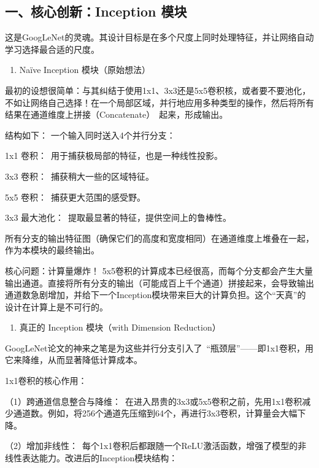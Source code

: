 \hypertarget{ux4e00ux6838ux5fc3ux521bux65b0inception-ux6a21ux5757}{%
\subsection{一、核心创新：Inception 模块}\label{ux4e00ux6838ux5fc3ux521bux65b0inception-ux6a21ux5757}}

这是GoogLeNet的灵魂。其设计目标是在多个尺度上同时处理特征，并让网络自动学习选择最合适的尺度。

\begin{enumerate}
\def\labelenumi{\arabic{enumi}.}
\tightlist
\item
  Naïve Inception 模块（原始想法）
\end{enumerate}

最初的设想很简单：与其纠结于使用1x1、3x3还是5x5卷积核，或者要不要池化，不如让网络自己选择！在一个局部区域，并行地应用多种类型的操作，然后将所有结果在通道维度上拼接（Concatenate）~起来，形成输出。

结构如下：
一个输入同时送入4个并行分支：

1x1 卷积：~用于捕获极局部的特征，也是一种线性投影。

3x3 卷积：~捕获稍大一些的区域特征。

5x5 卷积：~捕获更大范围的感受野。

3x3 最大池化：~提取最显著的特征，提供空间上的鲁棒性。

所有分支的输出特征图（确保它们的高度和宽度相同）在通道维度上堆叠在一起，作为本模块的最终输出。

核心问题：计算量爆炸！
5x5卷积的计算成本已经很高，而每个分支都会产生大量输出通道。直接将所有分支的输出（可能成百上千个通道）拼接起来，会导致输出通道数急剧增加，并给下一个Inception模块带来巨大的计算负担。这个``天真''的设计在计算上是不可行的。

\begin{enumerate}
\def\labelenumi{\arabic{enumi}.}
\setcounter{enumi}{1}
\tightlist
\item
  真正的 Inception 模块（with Dimension Reduction）
\end{enumerate}

GoogLeNet论文的神来之笔是为这些并行分支引入了~``瓶颈层''------即1x1卷积，用它来降维，从而显著降低计算成本。

1x1卷积的核心作用：

（1）跨通道信息整合与降维：~在进入昂贵的3x3或5x5卷积之前，先用1x1卷积减少通道数。例如，将256个通道先压缩到64个，再进行3x3卷积，计算量会大幅下降。

（2）增加非线性：~每个1x1卷积后都跟随一个ReLU激活函数，增强了模型的非线性表达能力。改进后的Inception模块结构：

